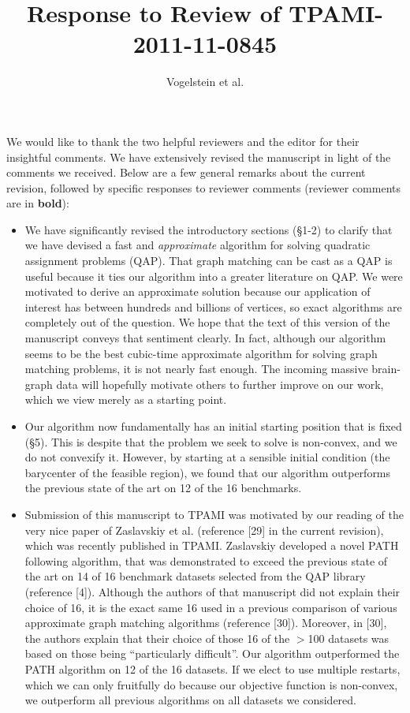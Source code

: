 \documentclass[11pt]{article}
\title{Response to Review of TPAMI-2011-11-0845}
\author{Vogelstein et al.}
\begin{document}
\maketitle

We would like to thank the two helpful reviewers and the editor for their insightful comments.  We have extensively revised the manuscript in light of the comments we received.  Below are a few general remarks about the current revision, followed by specific responses to reviewer comments (reviewer comments are in \textbf{bold}):

\begin{itemize}
	\item  We have significantly revised the introductory sections (\S 1-2) to clarify that we have devised a fast and \emph{approximate} algorithm for solving quadratic assignment problems (QAP).  That graph matching can be cast as a QAP is useful because it ties our algorithm into a greater literature on QAP.	We were motivated to derive an approximate solution because our application of interest has between hundreds and billions of vertices, so exact algorithms are completely out of the question.  We hope that the text of this version of the manuscript conveys that sentiment clearly.  In fact, although our algorithm seems to be the best cubic-time approximate algorithm for solving graph matching problems, it is not nearly fast enough.  The incoming massive brain-graph data will hopefully motivate others to further improve on our work, which we view merely as a starting point.
	\item Our algorithm now fundamentally has an initial starting position that is fixed (\S 5).  This is despite that the problem we seek to solve is non-convex, and we do not convexify it.  However, by starting at a sensible initial condition (the barycenter of the feasible region), we found that our algorithm outperforms the previous state of the art on 12 of the 16 benchmarks.  
	\item Submission of this manuscript to TPAMI was motivated by our reading of the very nice paper of Zaslavskiy et al. (reference [29] in the current revision), which was recently published in TPAMI.  Zaslavskiy developed a novel PATH following algorithm, that was demonstrated to exceed the previous state of the art on 14 of 16 benchmark datasets selected from the QAP library (reference [4]).  Although the authors of that manuscript did not explain their choice of 16, it is the exact same 16 used in a previous comparison of various approximate graph matching algorithms (reference [30]). Moreover, in [30], the authors explain that their choice of those 16 of the $>$100 datasets was based on those being ``particularly difficult''.   Our algorithm outperformed the PATH algorithm on 12 of the 16 datasets.  If we elect to use multiple restarts, which we can only fruitfully do because our objective function is non-convex, we outperform all previous algorithms on all datasets we considered.
\end{itemize}
 
\end{document}
